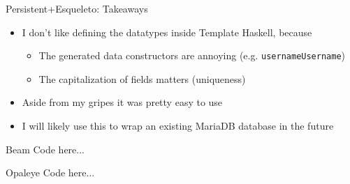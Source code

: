 \documentclass[hyperref={pdfpagelabels=false},12pt]{beamer}
\newcommand{\haskell}[1]{\texttt{#1}}
\begin{document}
\begin{frame}{Persistent+Esqueleto: Takeaways}
  \begin{itemize}
    \item I don't like defining the datatypes inside Template Haskell, because
    \begin{itemize}
      \item The generated data constructors are annoying (e.g.
        \haskell{usernameUsername})
      \item The capitalization of fields matters (uniqueness)
    \end{itemize}
    \item Aside from my gripes it was pretty easy to use
    \item I will likely use this to wrap an existing MariaDB database in the future
  \end{itemize}
\end{frame}

\begin{frame}{Beam}
  Code here...
\end{frame}

\begin{frame}{Opaleye}
  Code here...
\end{frame}
\end{document}
